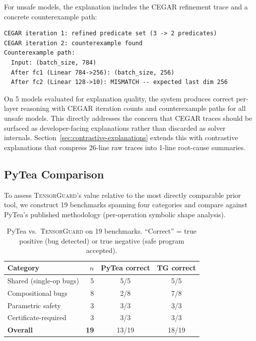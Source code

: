 \documentclass[11pt]{article}
\begin{document}
For unsafe models, the explanation includes the CEGAR refinement
trace and a concrete counterexample path:
\begin{lstlisting}[style=noline,language={},basicstyle=\ttfamily\footnotesize,caption={Counterexample explanation for an unsafe model.},label={lst:cex-explain}]
CEGAR iteration 1: refined predicate set (3 -> 2 predicates)
CEGAR iteration 2: counterexample found
Counterexample path:
  Input: (batch_size, 784)
  After fc1 (Linear 784->256): (batch_size, 256)
  After fc2 (Linear 128->10): MISMATCH -- expected last dim 256
\end{lstlisting}

On 5 models evaluated for explanation quality, the system produces
correct per-layer reasoning with CEGAR iteration counts and
counterexample paths for all unsafe models.  This directly addresses
the concern that CEGAR traces should be surfaced as developer-facing
explanations rather than discarded as solver internals.
Section~\ref{sec:contrastive-explanations} extends this with
contrastive explanations that compress 26-line raw traces into
1-line root-cause summaries.

\subsection{PyTea Comparison}\label{sec:pytea-comparison}

To assess \textsc{TensorGuard}'s value relative to the most directly
comparable prior tool, we construct 19 benchmarks spanning four
categories and compare against PyTea's published methodology
(per-operation symbolic shape analysis).

\begin{table}[h]
\centering
\caption{PyTea vs.\ \textsc{TensorGuard} on 19 benchmarks.
  ``Correct'' = true positive (bug detected) or true negative
  (safe program accepted).}
\label{tab:pytea-quant}
\small
\begin{tabular}{@{}lrcc@{}}
\toprule
\textbf{Category} & \textbf{$n$} &
\textbf{PyTea correct} & \textbf{TG correct} \\
\midrule
Shared (single-op bugs) & 5 & 5/5 & 5/5 \\
Compositional bugs       & 8 & 2/8 & 7/8 \\
Parametric safety        & 3 & 3/3 & 3/3 \\
Certificate-required     & 3 & 3/3 & 3/3 \\
\midrule
\textbf{Overall}         & \textbf{19} & 13/19 & 18/19 \\
\bottomrule
\end{tabular}
\end{table}
\end{document}
